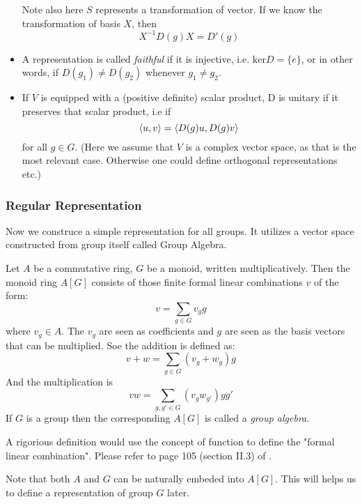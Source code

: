 \begin{itemize}
        Note also here $S$ represents a transformation of vector. If we
        know the transformation of basis $X$, then
        \begin{equation}
            X^{-1} D(g)X = D'(g)
        \end{equation}
    \item A representation is called
        \textit{faithful} if it is injective, i.e.
        $\mathrm{ker} D = \{e\}$, or in other words, if $D(g_1) \neq
        D(g_2)$ whenever $g_1 \neq g_2$.
    \item If $V$ is equipped with a (positive definite) scalar
        product, D is unitary if it preserves that scalar product, i.e
        if
        \begin{equation}
            \braket{u,v} = \braket{D(g)u,D(g)v}
        \end{equation}
        for all $g\in G$. (Here we assume that $V$ is a complex vector
        space, as that is the most relevant case. Otherwise one could
        define orthogonal representations etc.)
\end{itemize}

\subsubsection{Regular Representation}
\label{sec:Regular-Representation}

Now we construce a simple representation for all groups. It utilizes a
vector space constructed from group itself called Group Algebra.

\begin{defi}

    Let $A$ be a commutative ring, $G$ be a monoid, written
    multiplicatively. Then the monoid ring $A[G]$ consists of those
    finite formal linear combinations $v$ of the form:
    \begin{equation}
        v = \sum_{g\in G} v_g g
    \end{equation}
    where $v_g \in A$. The $v_g$ are seen as coefficients and $g$ are
    seen as the basis vectors that can be multiplied. Soe the addition
    is defined as:
    \begin{equation}
        v+w = \sum_{g\in G} (v_g + w_g) g
    \end{equation}
    And the multiplication is
    \begin{equation}
        v w = \sum_{g,g'\in G} (v_g w_{g'}) gg'
    \end{equation}
    If $G$ is a group then the
    corresponding $A[G]$ is called a \textit{group algebra}.
\end{defi}
A rigorious definition would use the concept of function to define the
"formal linear combination". Please refer to page 105 (section II.3) of
\cite{lang-algebra}. 
\begin{remark}
    Note that both $A$ and $G$ can be naturally embeded into $A[G]$.
    This will helps us to define a representation of group $G$ later.
\end{remark}

